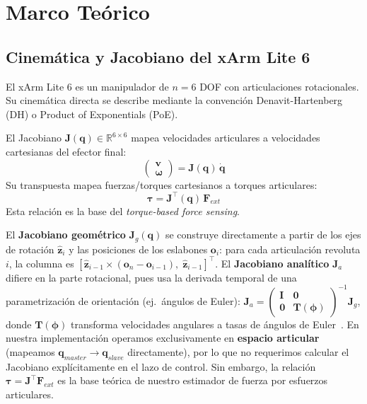 \documentclass[journal,10pt,twoside]{IEEEtran}
\begin{document}
\section{Marco Teórico}
\label{sec:background}

\subsection{Cinemática y Jacobiano del xArm Lite 6}

El xArm Lite 6 es un manipulador de $n=6$ DOF con articulaciones
rotacionales. Su cinemática directa se describe mediante la convención
Denavit-Hartenberg (DH) o Product of Exponentials (PoE).

\begin{theorybox}
  El Jacobiano $\bm{J}(\bm{q}) \in \mathbb{R}^{6\times6}$ mapea
  velocidades articulares a velocidades cartesianas del efector final:
  \[
    \begin{pmatrix} \bm{v} \\ \bm{\omega} \end{pmatrix} = \bm{J}(\bm{q})\,\dot{\bm{q}}
  \]
  Su transpuesta mapea fuerzas/torques cartesianos a torques articulares:
  \[
    \bm{\tau} = \bm{J}^\top(\bm{q})\,\bm{F}_{ext}
  \]
  Esta relación es la base del \emph{torque-based force sensing}.
\end{theorybox}

El \textbf{Jacobiano geométrico} $\bm{J}_g(\bm{q})$ se construye
directamente a partir de los ejes de rotación $\hat{\bm{z}}_i$ y las
posiciones de los eslabones $\bm{o}_i$: para cada articulación
revoluta $i$, la columna es
$\left[\hat{\bm{z}}_{i-1}\times(\bm{o}_n-\bm{o}_{i-1}),\;\hat{\bm{z}}_{i-1}\right]^\top$.
El \textbf{Jacobiano analítico} $\bm{J}_a$ difiere en la parte
rotacional, pues usa la derivada temporal de una parametrización de
orientación (ej.\ ángulos de Euler):
$\bm{J}_a = \begin{pmatrix}\bm{I} & \bm{0}\\ \bm{0} & \bm{T}(\bm{\phi})\end{pmatrix}^{-1}\bm{J}_g$,
donde $\bm{T}(\bm{\phi})$ transforma velocidades angulares a tasas de
ángulos de Euler~\cite{siciliano2009}. En nuestra implementación
operamos exclusivamente en \textbf{espacio articular} (mapeamos
$\bm{q}_{master}\to\bm{q}_{slave}$ directamente), por lo que no
requerimos calcular el Jacobiano explícitamente en el lazo de control.
Sin embargo, la relación $\bm{\tau}=\bm{J}^\top\bm{F}_{ext}$ es la
base teórica de nuestro estimador de fuerza por esfuerzos articulares.
\end{document}
